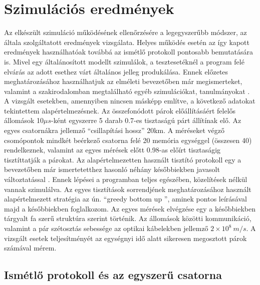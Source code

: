 \chapter{Szimulációs eredmények}

Az elkészült szimuláció működésének ellenőrzésére a legegyszerűbb módszer, az általa szolgáltatott eredmények vizsgálata. Helyes működés esetén az így kapott eredmények használhatóak továbbá az ismétlő protokoll pontosabb bemutatására is. Mivel egy általánosított modellt szimulálok, a tesztesetéknél a program felé elvárás az adott esethez várt általános jelleg produkálása. Ennek előzetes meghatározásához használhatjuk az elméleti bevezetőben már megismerteket, valamint  a szakirodalomban megtalálható egyéb szimulációkat, tanulmányokat \cite{briegel1998quantum}\cite{van2009system}\cite{bernardes2011rate}. A vizsgált esetekben, amennyiben nincsen másképp említve, a következő adatokat tekintettem alapértelmezésnek. 
Az összefonódott párok előállításáért felelős állomások 10$\mu s$-ként egyszerre 5 darab 0.7-es tisztaságú párt állítínak elő. Az egyes csatornákra jellemző ``csillapítási hossz'' 20km. A méréseket végző csomópontok mindkét beérkező csatorna felé 20 memória egységgel (összesen 40) rendelkeznek, valamint az egyes mérések előtt 0.98-as előírt tisztaságig tisztíttatják a párokat. Az alapértelmezetten használt tisztító protokoll egy a bevezetőben már ismertetetthez hasonló \cite{deutsch1996quantum} néhány későbbiekben javasolt változtatással \cite{briegel1998quantum}. Ennek lépései a programban teljes egészében, közelítések nélkül vannak szimulálva. Az egyes tisztítások sorrendjének meghatározásához használt alapértelmezett stratégia az ún. ``greedy bottom up '', aminek pontos leírásával majd a későbbiekben foglalkozom. Az egyes mérések elvégzése egy a későbbiekben tárgyalt fa szerű struktúra szerint történik. Az állomások közötti kommunikáció, valamint a pár szétosztás sebessége az optikai kábelekben jellemző $2 \times 10^8 \ m/s$. A vizsgált esetek teljesítményét az egységnyi idő alatt sikeresen megosztott párok számával mérem.

\section{Ismétlő protokoll és az egyszerű csatorna}

